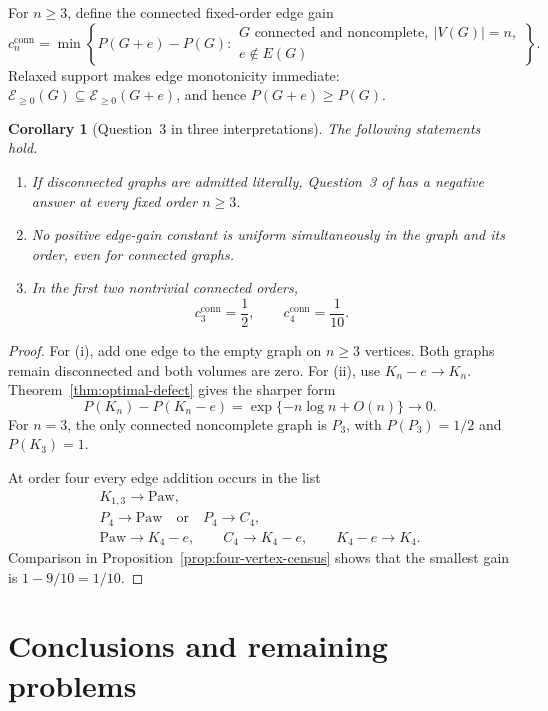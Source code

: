 \documentclass[11pt,reqno]{amsart}
\newtheorem{corollary}[theorem]{Corollary}
\theoremstyle{definition}
\theoremstyle{remark}
\begin{document}
For $n\ge3$, define the connected fixed-order edge gain
\[
  c_n^{\mathrm{conn}}=\min\left\{P(G+e)-P(G):
  \begin{array}{l}
  G\text{ connected and noncomplete},\ |V(G)|=n,\\
  e\notin E(G)
  \end{array}\right\}.
\]
Relaxed support makes edge monotonicity immediate:
$\mathcal E_{\ge0}(G)\subseteq\mathcal E_{\ge0}(G+e)$, and hence
$P(G+e)\ge P(G)$.

\begin{corollary}[Question~3 in three interpretations]
\label{cor:q3-interpretations}
The following statements hold.
\begin{enumerate}[label=\textup{(\roman*)}]
\item If disconnected graphs are admitted literally, Question~3 of
\cite{EJT2026} has a negative answer at every fixed order $n\ge3$.
\item No positive edge-gain constant is uniform simultaneously in the graph
and its order, even for connected graphs.
\item In the first two nontrivial connected orders,
\[
  c_3^{\mathrm{conn}}=\frac12,
  \qquad c_4^{\mathrm{conn}}=\frac1{10}.
\]
\end{enumerate}
\end{corollary}

\begin{proof}
For (i), add one edge to the empty graph on $n\ge3$ vertices.  Both graphs
remain disconnected and both volumes are zero.  For (ii), use
$K_n-e\to K_n$.  Theorem~\ref{thm:optimal-defect} gives the sharper form
\[
  P(K_n)-P(K_n-e)=\exp\{-n\log n+O(n)\}\longrightarrow0.
\]
For $n=3$, the only connected noncomplete graph is $P_3$, with
$P(P_3)=1/2$ and $P(K_3)=1$.

At order four every edge addition occurs in the list
\[
\begin{gathered}
 K_{1,3}\longrightarrow\mathrm{Paw},\\
 P_4\longrightarrow\mathrm{Paw}\quad\text{or}\quad P_4\longrightarrow C_4,\\
 \mathrm{Paw}\longrightarrow K_4-e,\qquad
 C_4\longrightarrow K_4-e,\qquad K_4-e\longrightarrow K_4.
\end{gathered}
\]
Comparison in Proposition~\ref{prop:four-vertex-census} shows that the
smallest gain is $1-9/10=1/10$.
\end{proof}

\section{Conclusions and remaining problems}\label{sec:remaining}
\end{document}
